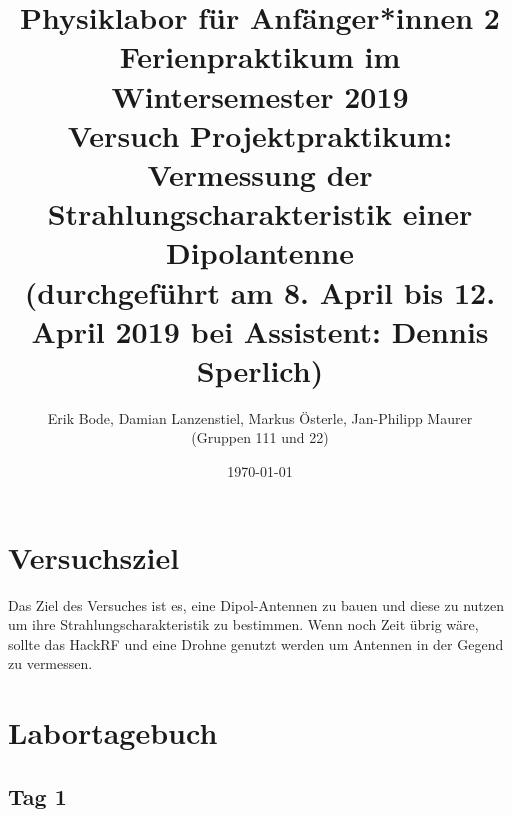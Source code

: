 \documentclass[titlepage,11pt,a4paper,ngerman]{article}
\begin{document}
\title{
	\large Physiklabor für Anfänger*innen 2 \\
	Ferienpraktikum im Wintersemester 2019 \\[4mm]
	\textbf{\LARGE 
		Versuch Projektpraktikum:\\[3mm]
		Vermessung der Strahlungscharakteristik einer Dipolantenne
			} \\[3mm]
	(durchgeführt am 8. April bis 12. April 2019 bei Assistent: Dennis Sperlich) \\}
\author{Erik Bode, Damian Lanzenstiel, Markus Österle, Jan-Philipp Maurer \\ (Gruppen 111 und 22)}
\date{\today}
\maketitle
\tableofcontents


\section{Versuchsziel}

Das Ziel des Versuches ist es, eine Dipol-Antennen zu bauen und diese zu nutzen um ihre Strahlungscharakteristik zu bestimmen. Wenn noch Zeit übrig wäre, sollte das HackRF und eine Drohne genutzt werden um Antennen in der Gegend zu vermessen.

\section{Labortagebuch}

\subsection{Tag 1}
\end{document}
